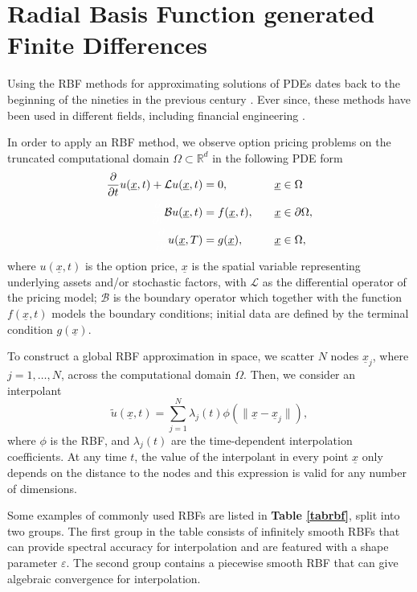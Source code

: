 \documentclass{UUThesisTemplate}
\begin{document}
\chapter{Radial Basis Function generated Finite Differences}
\label{ch:rbffd}
\par Using the RBF methods for approximating solutions of PDEs dates back to the beginning of the nineties in the previous century \cite{kansa1990multiquadrics1,kansa1990multiquadrics2}. Ever since, these methods have been used in different fields, including financial engineering \cite{hon1999radial, fasshauer2004using,pettersson2008improved}. 
\par In order to apply an RBF method, we observe option pricing problems on the truncated computational domain $\Omega\subset \mathbb{R}^{d}$ in the following PDE form
\begin{alignat}{2}
\frac{\partial}{\partial t}u(\underline{x},t) + \mathcal{L}u(\underline{x},t) &= 0, \quad &&\underline{x} \in \Omega \label{eqPDE} \\
{\color{white} \frac{\partial}{\partial t}} \mathcal{B}u(\underline{x},t) &= f(\underline{x},t), \quad &&\underline{x} \in \partial \Omega, \label{eqBC} \\
{\color{white} \frac{\partial}{\partial t}} u(\underline{x},T) &= g(\underline{x}), \quad &&\underline{x} \in \Omega, \label{eqTC}
\end{alignat}
where $u(\underline{x},t)$ is the option price, $\underline{x}$ is the spatial variable representing underlying assets and/or stochastic factors, with $\mathcal{L}$ as the differential operator of the pricing model; $\mathcal{B}$ is the boundary operator which together with the function $f(\underline{x},t)$ models the boundary conditions; initial data are defined by the terminal condition $g(\underline{x})$. 
\par To construct a global RBF approximation in space, we scatter $N$ nodes $\underline{x}_j$, where $j=1,\ldots,N$, across the computational domain $\Omega$. Then, we consider an interpolant
\begin{equation}
\label{eq:RBFint}
	\tilde{u}(\underline{x},t) = \sum_{j=1}^N \lambda_j(t) \phi(\|\underline{x}-\underline{x}_j\|),
\end{equation}
where $\phi$ is the RBF, and $\lambda_j(t)$ are the time-dependent interpolation coefficients. At any time $t$, the value of the interpolant in every point $\underline{x}$ only depends on the distance to the nodes and this expression is valid for any number of dimensions. 
\par Some examples of commonly used RBFs are listed in \textbf{Table \ref{tabrbf}}, split into two groups. The first group in the table consists of infinitely smooth RBFs that can provide spectral accuracy for interpolation and are featured with a shape parameter $\varepsilon$. The second group contains a piecewise smooth RBF that can give algebraic convergence for interpolation.%
\end{document}
